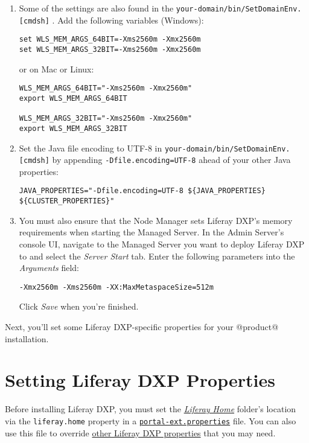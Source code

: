 \begin{enumerate}
\def\labelenumi{\arabic{enumi}.}
\setcounter{enumi}{2}
\item
  Some of the settings are also found in the
  \texttt{your-domain/bin/SetDomainEnv.{[}cmd\textbar{}sh{]}} . Add the
  following variables (Windows):

\begin{verbatim}
set WLS_MEM_ARGS_64BIT=-Xms2560m -Xmx2560m
set WLS_MEM_ARGS_32BIT=-Xms2560m -Xmx2560m
\end{verbatim}

  or on Mac or Linux:

\begin{verbatim}
WLS_MEM_ARGS_64BIT="-Xms2560m -Xmx2560m"
export WLS_MEM_ARGS_64BIT

WLS_MEM_ARGS_32BIT="-Xms2560m -Xmx2560m"
export WLS_MEM_ARGS_32BIT
\end{verbatim}
\item
  Set the Java file encoding to UTF-8 in
  \texttt{your-domain/bin/SetDomainEnv.{[}cmd\textbar{}sh{]}} by
  appending \texttt{-Dfile.encoding=UTF-8} ahead of your other Java
  properties:

\begin{verbatim}
JAVA_PROPERTIES="-Dfile.encoding=UTF-8 ${JAVA_PROPERTIES} ${CLUSTER_PROPERTIES}"
\end{verbatim}
\item
  You must also ensure that the Node Manager sets Liferay DXP's memory
  requirements when starting the Managed Server. In the Admin Server's
  console UI, navigate to the Managed Server you want to deploy Liferay
  DXP to and select the \emph{Server Start} tab. Enter the following
  parameters into the \emph{Arguments} field:

\begin{verbatim}
-Xmx2560m -Xms2560m -XX:MaxMetaspaceSize=512m
\end{verbatim}

  Click \emph{Save} when you're finished.
\end{enumerate}

Next, you'll set some Liferay DXP-specific properties for your @product@
installation.

\section{Setting Liferay DXP
Properties}\label{setting-liferay-dxp-properties}

Before installing Liferay DXP, you must set the
\href{/docs/7-2/deploy/-/knowledge_base/d/liferay-home}{\emph{Liferay
Home}} folder's location via the \texttt{liferay.home} property in a
\href{/docs/7-2/deploy/-/knowledge_base/d/portal-properties}{\texttt{portal-ext.properties}}
file. You can also use this file to override
\href{@platform-ref@/7.2-latest/propertiesdoc/portal.properties.html}{other
Liferay DXP properties} that you may need.


